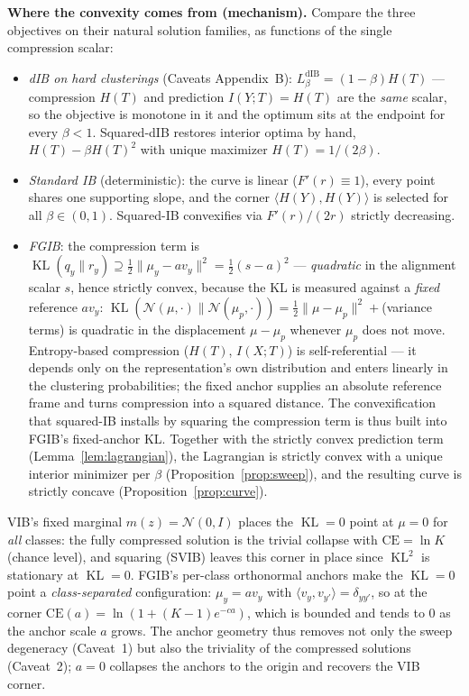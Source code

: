 \textbf{Where the convexity comes from (mechanism).}
Compare the three objectives on their natural solution families, as functions of the single
compression scalar:
\begin{itemize}
\item \emph{dIB on hard clusterings} (Caveats Appendix~B): $L^{\mathrm{dIB}}_\beta
= (1-\beta)H(T)$ --- compression $H(T)$ and prediction $I(Y;T) = H(T)$ are the \emph{same}
scalar, so the objective is monotone in it and the optimum sits at the endpoint for every
$\beta < 1$. Squared-dIB restores interior optima by hand, $H(T) - \beta H(T)^2$ with
unique maximizer $H(T) = 1/(2\beta)$.
\item \emph{Standard IB} (deterministic): the curve is linear ($F'(r) \equiv 1$), every
point shares one supporting slope, and the corner $\langle H(Y), H(Y)\rangle$ is selected
for all $\beta \in (0,1)$. Squared-IB convexifies via $F'(r)/(2r)$ strictly decreasing.
\item \emph{FGIB}: the compression term is $\operatorname{KL}(q_y \| r_y) \supseteq
\tfrac{1}{2}\|\mu_y - a v_y\|^2 = \tfrac{1}{2}(s-a)^2$ --- \emph{quadratic} in the
alignment scalar $s$, hence strictly convex, because the KL is measured against a
\emph{fixed} reference $a v_y$: $\operatorname{KL}(\mathcal{N}(\mu,\cdot)\|\mathcal{N}(\mu_p,\cdot))
= \tfrac{1}{2}\|\mu - \mu_p\|^2 + {}$(variance terms) is quadratic in the displacement
$\mu - \mu_p$ whenever $\mu_p$ does not move. Entropy-based compression ($H(T)$, $I(X;T)$)
is self-referential --- it depends only on the representation's own distribution and enters
linearly in the clustering probabilities; the fixed anchor supplies an absolute reference
frame and turns compression into a squared distance. The convexification that squared-IB
installs by squaring the compression term is thus built into FGIB's fixed-anchor KL.
Together with the strictly convex prediction term (Lemma~\ref{lem:lagrangian}), the
Lagrangian is strictly convex with a unique interior minimizer per $\beta$
(Proposition~\ref{prop:sweep}), and the resulting curve is strictly concave
(Proposition~\ref{prop:curve}).
\end{itemize}

\begin{remark}\label{rem:endpoint}
VIB's fixed marginal $m(z) = \mathcal{N}(0, I)$ places the $\operatorname{KL}=0$ point at
$\mu = 0$ for \emph{all} classes: the fully compressed solution is the trivial collapse with
$\mathrm{CE} = \ln K$ (chance level), and squaring (SVIB) leaves this corner in place since
$\operatorname{KL}^2$ is stationary at $\operatorname{KL}=0$. FGIB's per-class orthonormal
anchors make the $\operatorname{KL}=0$ point a \emph{class-separated} configuration:
$\mu_y = a v_y$ with $\langle v_y, v_{y'}\rangle = \delta_{yy'}$, so at the corner
$\mathrm{CE}(a) = \ln(1 + (K-1)e^{-ca})$, which is bounded and tends to $0$ as the anchor
scale $a$ grows. The anchor geometry thus removes not only the sweep degeneracy (Caveat~1)
but also the triviality of the compressed solutions (Caveat~2); $a = 0$ collapses the
anchors to the origin and recovers the VIB corner.
\end{remark}

